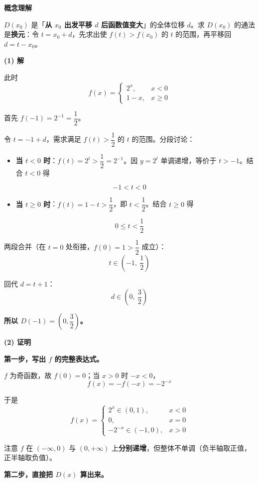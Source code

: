 \par\medskip

\textbf{概念理解}

$D(x_0)$ 是「\textbf{从 $x_0$ 出发平移 $d$ 后函数值变大}」的全体位移 $d$。求 $D(x_0)$ 的通法是\textbf{换元}：令 $t=x_0+d$，先求出使 $f(t)>f(x_0)$ 的 $t$ 的范围，再平移回 $d=t-x_0$。

\par\medskip

\textbf{(1) 解}

此时
\[f(x)=\begin{cases}2^{x},&x<0\\ 1-x,&x\ge0\end{cases}\]

首先 $f(-1)=2^{-1}=\dfrac12$。

令 $t=-1+d$，需求满足 $f(t)>\dfrac12$ 的 $t$ 的范围。分段讨论：

\begin{itemize}
\item \textbf{当 $t<0$ 时}：$f(t)=2^{t}>\dfrac12=2^{-1}$。因 $y=2^t$ 单调递增，等价于 $t>-1$。结合 $t<0$ 得
\end{itemize}
\[-1<t<0\]
\begin{itemize}
\item \textbf{当 $t\ge0$ 时}：$f(t)=1-t>\dfrac12$，即 $t<\dfrac12$。结合 $t\ge0$ 得
\end{itemize}
\[0\le t<\frac12\]

两段合并（在 $t=0$ 处衔接，$f(0)=1>\dfrac12$ 成立）：
\[t\in\left(-1,\ \frac12\right)\]

回代 $d=t+1$：
\[d\in\left(0,\ \frac32\right)\]

\textbf{所以 $D(-1)=\left(0,\dfrac32\right)$。}

\par\medskip

\textbf{(2) 证明}

\textbf{第一步，写出 $f$ 的完整表达式。}

$f$ 为奇函数，故 $f(0)=0$；当 $x>0$ 时 $-x<0$，
\[f(x)=-f(-x)=-2^{-x}\]

于是
\[f(x)=\begin{cases}2^{x}\in(0,1),&x<0\\ 0,&x=0\\ -2^{-x}\in(-1,0),&x>0\end{cases}\]

注意 $f$ 在 $(-\infty,0)$ 与 $(0,+\infty)$ 上\textbf{分别递增}，但整体不单调（负半轴取正值，正半轴取负值）。

\textbf{第二步，直接把 $D(x)$ 算出来。}

